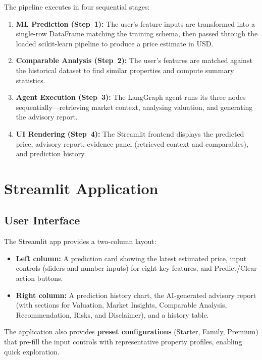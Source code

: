 \documentclass[11pt,a4paper]{article}
\begin{document}
The pipeline executes in four sequential stages:

\begin{enumerate}[leftmargin=*]
    \item \textbf{ML Prediction (Step~1):} The user's feature inputs are transformed into a single-row DataFrame matching the training schema, then passed through the loaded scikit-learn pipeline to produce a price estimate in USD.
    \item \textbf{Comparable Analysis (Step~2):} The user's features are matched against the historical dataset to find similar properties and compute summary statistics.
    \item \textbf{Agent Execution (Step~3):} The LangGraph agent runs its three nodes sequentially---retrieving market context, analysing valuation, and generating the advisory report.
    \item \textbf{UI Rendering (Step~4):} The Streamlit frontend displays the predicted price, advisory report, evidence panel (retrieved context and comparables), and prediction history.
\end{enumerate}

\section{Streamlit Application}

\subsection{User Interface}

The Streamlit app provides a two-column layout:

\begin{itemize}[leftmargin=*]
    \item \textbf{Left column:} A prediction card showing the latest estimated price, input controls (sliders and number inputs) for eight key features, and Predict/Clear action buttons.
    \item \textbf{Right column:} A prediction history chart, the AI-generated advisory report (with sections for Valuation, Market Insights, Comparable Analysis, Recommendation, Risks, and Disclaimer), and a history table.
\end{itemize}

The application also provides \textbf{preset configurations} (Starter, Family, Premium) that pre-fill the input controls with representative property profiles, enabling quick exploration.
\end{document}
